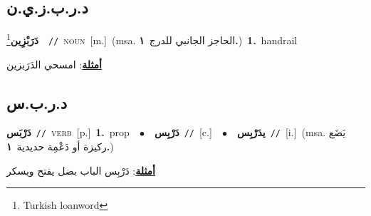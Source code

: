 \documentclass[10pt,a4paper,twoside]{article} %
\begin{document}
\begin{multicols}{2}
\vspace{-3mm}
\subsection*{\color{blue}\foreignlanguage{arabic}{د.ر.ب.ز.ي.ن}\color{blue}{ (ntws)}} 

{\setlength\topsep{0pt}\textbf{\foreignlanguage{arabic}{دَرَبْزِين}}\footnote{Turkish loanword}\ \ {\color{gray}\texttt{//}\color{black}}\ \textsc{noun}\ [m.]\ \color{gray}(msa. \foreignlanguage{arabic}{الحاجز الجانبي للدرج}~\foreignlanguage{arabic}{\textbf{١.}})\color{black}\ \textbf{1.}~handrail\  \begin{flushright}\color{gray}\foreignlanguage{arabic}{\textbf{\underline{\foreignlanguage{arabic}{أمثلة}}}: امسحي الدَرَبزين}\end{flushright}\color{black}} \vspace{2mm}

\vspace{-3mm}
\subsection*{\color{blue}\foreignlanguage{arabic}{د.ر.ب.س}\color{blue}{}} 

{\setlength\topsep{0pt}\textbf{\foreignlanguage{arabic}{دَرْبَس}}\ {\color{gray}\texttt{//}\color{black}}\ \textsc{verb}\ [p.]\ \textbf{1.}~prop\ \ $\bullet$\ \ \setlength\topsep{0pt}\textbf{\foreignlanguage{arabic}{دَرْبِس}}\ {\color{gray}\texttt{//}\color{black}}\ [c.]\ \ $\bullet$\ \ \setlength\topsep{0pt}\textbf{\foreignlanguage{arabic}{يدَرْبِس}}\ {\color{gray}\texttt{//}\color{black}}\ [i.]\ \color{gray}(msa. \foreignlanguage{arabic}{يَضَع ركيزة أو دَعْمِة حديدية}~\foreignlanguage{arabic}{\textbf{١.}})\color{black}\  \begin{flushright}\color{gray}\foreignlanguage{arabic}{\textbf{\underline{\foreignlanguage{arabic}{أمثلة}}}: دَرْبِس الباب بضل يفتح ويسكر}\end{flushright}\color{black}} \vspace{2mm}


\end{multicols}
\end{document}
